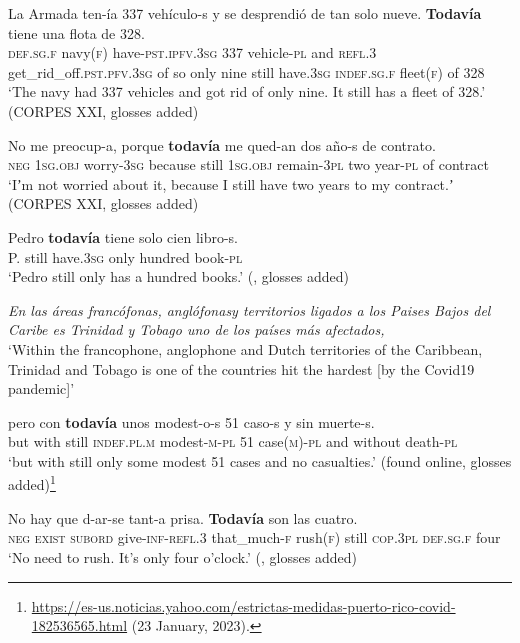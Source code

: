 \begin{exe}
	\ex\label{exAppendixSpanishTodaviaScalar1}

\gll La Armada ten-ía 337 vehículo-s y se desprendió de tan solo nueve. \textbf{Todavía} tiene una flota de 328.\\
\textsc{def}.\textsc{sg}.\textsc{f} navy(\textsc{f}) have-\textsc{pst}.\textsc{ipfv}.3\textsc{sg} 337 vehicle-\textsc{pl} and \textsc{refl}.3 get\_rid\_off.\textsc{pst}.\textsc{pfv}.3\textsc{sg} of so only nine still have.3\textsc{sg} \textsc{indef}.\textsc{sg}.\textsc{f} fleet(\textsc{f}) of 328\\
\glt \lq The navy had 337 vehicles and got rid of only nine. It still has a fleet of 328.\rq{ }(CORPES XXI, glosses added)
	
	\ex\label{exAppendixSpanishTodaviaScalar2}
	\gll No me preocup-a, porque \textbf{todavía} me qued-an dos año-s de contrato.\\
	\textsc{neg} 1\textsc{sg}.\textsc{obj} worry-3\textsc{sg} because still 1\textsc{sg}.\textsc{obj} remain-3\textsc{pl} two year-\textsc{pl} of contract\\
	\glt \lq Iʼm not worried about it, because I still have two years to my contract.ʼ (CORPES XXI, glosses added)
	
	\ex\label{exAppendixSpanishTodaviaScalar3}
	\gll Pedro \textbf{todavía} tiene solo cien libro-s.\\
	P. still have.3\textsc{sg} only hundred book-\textsc{pl}\\
	\glt \lq Pedro still only has a hundred books.' (\cite[383]{Garrido1992}, glosses added)

	\ex\label{exAppendixSpanishTodaviaScalar4}
	\textit{En las áreas francófonas, anglófonasy territorios ligados a los Paises Bajos del Caribe es Trinidad y Tobago uno de los países más afectados,}\\
	\lq Within the francophone, anglophone and Dutch territories of the Caribbean, Trinidad and Tobago is one of the countries hit the hardest [by the Covid19 pandemic]\rq{}
			
	\exi{}\gll pero con \textbf{todavía} unos modest-o-s 51 caso-s y sin muerte-s.\\
	 but with still \textsc{indef}.\textsc{pl}.\textsc{m} modest-\textsc{m}-\textsc{pl} 51 case(\textsc{m})-\textsc{pl} and without death-\textsc{pl}\\
	\glt \lq but with still only some modest 51 cases and no casualties.\rq{ }(found online, glosses added)\footnote{\url{https://es-us.noticias.yahoo.com/estrictas-medidas-puerto-rico-covid-182536565.html} (23 January, 2023).}
	
	\ex\label{exAppendixSpanishTodaviaScalar5}
	\gll No hay que d-ar-se tant-a prisa. \textbf{Todavía} son las cuatro.\\
	\textsc{neg} \textsc{exist} \textsc{subord} give-\textsc{inf}-\textsc{refl}.3 that\_much-\textsc{f} rush(\textsc{f}) still \textsc{cop}.3\textsc{pl} \textsc{def}.\textsc{sg}.\textsc{f} four\\
	\glt \lq No need to rush. It's only four o'clock.\rq{ }(\cite[220]{Bosque2016}, glosses added)
\end{exe}
\largerpage[-1]\pagebreak
